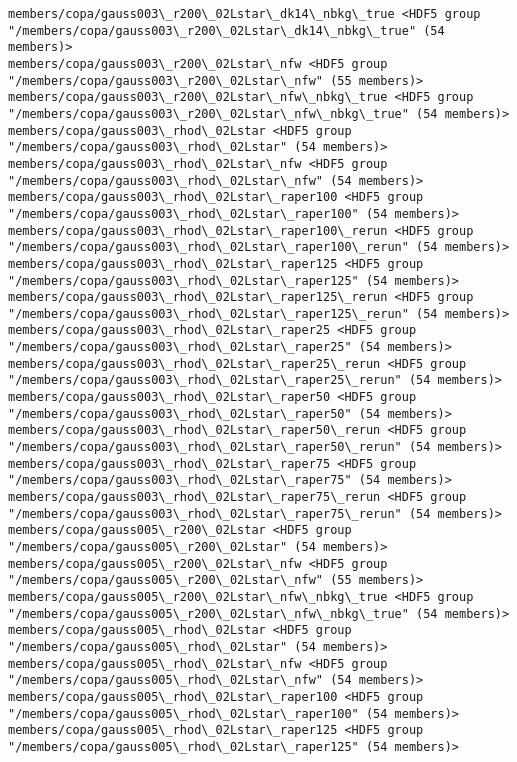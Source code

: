 \documentclass[11pt]{article}
\begin{document}
\begin{Verbatim}[commandchars=\\\{\}]
members/copa/gauss003\_r200\_02Lstar\_dk14\_nbkg\_true <HDF5 group "/members/copa/gauss003\_r200\_02Lstar\_dk14\_nbkg\_true" (54 members)>
members/copa/gauss003\_r200\_02Lstar\_nfw <HDF5 group "/members/copa/gauss003\_r200\_02Lstar\_nfw" (55 members)>
members/copa/gauss003\_r200\_02Lstar\_nfw\_nbkg\_true <HDF5 group "/members/copa/gauss003\_r200\_02Lstar\_nfw\_nbkg\_true" (54 members)>
members/copa/gauss003\_rhod\_02Lstar <HDF5 group "/members/copa/gauss003\_rhod\_02Lstar" (54 members)>
members/copa/gauss003\_rhod\_02Lstar\_nfw <HDF5 group "/members/copa/gauss003\_rhod\_02Lstar\_nfw" (54 members)>
members/copa/gauss003\_rhod\_02Lstar\_raper100 <HDF5 group "/members/copa/gauss003\_rhod\_02Lstar\_raper100" (54 members)>
members/copa/gauss003\_rhod\_02Lstar\_raper100\_rerun <HDF5 group "/members/copa/gauss003\_rhod\_02Lstar\_raper100\_rerun" (54 members)>
members/copa/gauss003\_rhod\_02Lstar\_raper125 <HDF5 group "/members/copa/gauss003\_rhod\_02Lstar\_raper125" (54 members)>
members/copa/gauss003\_rhod\_02Lstar\_raper125\_rerun <HDF5 group "/members/copa/gauss003\_rhod\_02Lstar\_raper125\_rerun" (54 members)>
members/copa/gauss003\_rhod\_02Lstar\_raper25 <HDF5 group "/members/copa/gauss003\_rhod\_02Lstar\_raper25" (54 members)>
members/copa/gauss003\_rhod\_02Lstar\_raper25\_rerun <HDF5 group "/members/copa/gauss003\_rhod\_02Lstar\_raper25\_rerun" (54 members)>
members/copa/gauss003\_rhod\_02Lstar\_raper50 <HDF5 group "/members/copa/gauss003\_rhod\_02Lstar\_raper50" (54 members)>
members/copa/gauss003\_rhod\_02Lstar\_raper50\_rerun <HDF5 group "/members/copa/gauss003\_rhod\_02Lstar\_raper50\_rerun" (54 members)>
members/copa/gauss003\_rhod\_02Lstar\_raper75 <HDF5 group "/members/copa/gauss003\_rhod\_02Lstar\_raper75" (54 members)>
members/copa/gauss003\_rhod\_02Lstar\_raper75\_rerun <HDF5 group "/members/copa/gauss003\_rhod\_02Lstar\_raper75\_rerun" (54 members)>
members/copa/gauss005\_r200\_02Lstar <HDF5 group "/members/copa/gauss005\_r200\_02Lstar" (54 members)>
members/copa/gauss005\_r200\_02Lstar\_nfw <HDF5 group "/members/copa/gauss005\_r200\_02Lstar\_nfw" (55 members)>
members/copa/gauss005\_r200\_02Lstar\_nfw\_nbkg\_true <HDF5 group "/members/copa/gauss005\_r200\_02Lstar\_nfw\_nbkg\_true" (54 members)>
members/copa/gauss005\_rhod\_02Lstar <HDF5 group "/members/copa/gauss005\_rhod\_02Lstar" (54 members)>
members/copa/gauss005\_rhod\_02Lstar\_nfw <HDF5 group "/members/copa/gauss005\_rhod\_02Lstar\_nfw" (54 members)>
members/copa/gauss005\_rhod\_02Lstar\_raper100 <HDF5 group "/members/copa/gauss005\_rhod\_02Lstar\_raper100" (54 members)>
members/copa/gauss005\_rhod\_02Lstar\_raper125 <HDF5 group "/members/copa/gauss005\_rhod\_02Lstar\_raper125" (54 members)>

\end{Verbatim}
\end{document}
